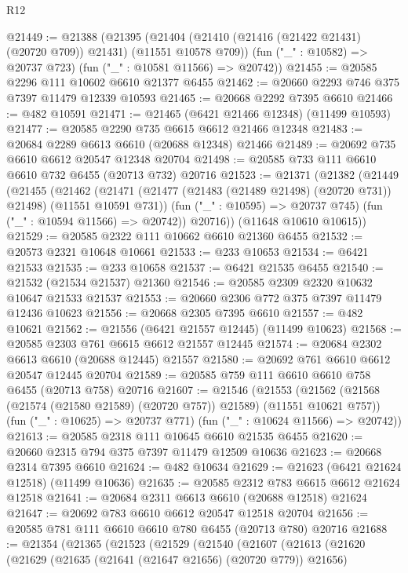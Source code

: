 \begin{lexlean}{R12}
\begin{coremodule}
@21449 := @21388
    (@21395
      (@21404 (@21410 (@21416 (@21422 @21431) (@20720 @709)) @21431) (@11551 @10578 @709))
      (fun ("_" : @10582) => @20737 @723)
      (fun ("_" : @10581 @11566) => @20742))
@21455 := @20585 @2296 @111 @10602 @6610 @21377 @6455
@21462 := @20660 @2293 @746 @375 @7397 @11479 @12339 @10593
@21465 := @20668 @2292 @7395 @6610
@21466 := @482 @10591
@21471 := @21465 (@6421 @21466 @12348) (@11499 @10593)
@21477 := @20585 @2290 @735 @6615 @6612 @21466 @12348
@21483 := @20684 @2289 @6613 @6610 (@20688 @12348) @21466
@21489 := @20692 @735 @6610 @6612 @20547 @12348 @20704
@21498 := @20585 @733 @111 @6610 @6610 @732 @6455 (@20713 @732) @20716
@21523 := @21371
    (@21382
      (@21449
        (@21455
          (@21462
            (@21471 (@21477 (@21483 (@21489 @21498) (@20720 @731)) @21498) (@11551 @10591 @731))
            (fun ("_" : @10595) => @20737 @745)
            (fun ("_" : @10594 @11566) => @20742))
          @20716))
      (@11648 @10610 @10615))
@21529 := @20585 @2322 @111 @10662 @6610 @21360 @6455
@21532 := @20573 @2321 @10648 @10661
@21533 := @233 @10653
@21534 := @6421 @21533
@21535 := @233 @10658
@21537 := @6421 @21535 @6455
@21540 := @21532 (@21534 @21537) @21360
@21546 := @20585 @2309 @2320 @10632 @10647 @21533 @21537
@21553 := @20660 @2306 @772 @375 @7397 @11479 @12436 @10623
@21556 := @20668 @2305 @7395 @6610
@21557 := @482 @10621
@21562 := @21556 (@6421 @21557 @12445) (@11499 @10623)
@21568 := @20585 @2303 @761 @6615 @6612 @21557 @12445
@21574 := @20684 @2302 @6613 @6610 (@20688 @12445) @21557
@21580 := @20692 @761 @6610 @6612 @20547 @12445 @20704
@21589 := @20585 @759 @111 @6610 @6610 @758 @6455 (@20713 @758) @20716
@21607 := @21546
    (@21553
      (@21562 (@21568 (@21574 (@21580 @21589) (@20720 @757)) @21589) (@11551 @10621 @757))
      (fun ("_" : @10625) => @20737 @771)
      (fun ("_" : @10624 @11566) => @20742))
@21613 := @20585 @2318 @111 @10645 @6610 @21535 @6455
@21620 := @20660 @2315 @794 @375 @7397 @11479 @12509 @10636
@21623 := @20668 @2314 @7395 @6610
@21624 := @482 @10634
@21629 := @21623 (@6421 @21624 @12518) (@11499 @10636)
@21635 := @20585 @2312 @783 @6615 @6612 @21624 @12518
@21641 := @20684 @2311 @6613 @6610 (@20688 @12518) @21624
@21647 := @20692 @783 @6610 @6612 @20547 @12518 @20704
@21656 := @20585 @781 @111 @6610 @6610 @780 @6455 (@20713 @780) @20716
@21688 := @21354
    (@21365
      (@21523
        (@21529
          (@21540
            (@21607
              (@21613
                (@21620
                  (@21629
                    (@21635 (@21641 (@21647 @21656) (@20720 @779)) @21656)

\end{coremodule}
\end{lexlean}
